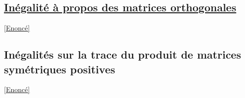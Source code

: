 \documentclass[8pt]{book}
\begin{document}
	\subsection{\underline{Inégalité à propos des matrices orthogonales} }
	\label{Inégalité à propos des matrices orthogonales corrigé}
	\textcolor{blue}{\hyperref[Inégalité à propos des matrices orthogonales]{[Enoncé]}}\\
	
	\subsection{Inégalités sur la trace du produit de matrices symétriques positives }
	\label{Inégalités sur la trace du produit de matrices symétriques positives corrigé}
	\textcolor{blue}{\hyperref[Inégalités sur la trace du produit de matrices symétriques positives]{[Enoncé]}}\\
\end{document}
